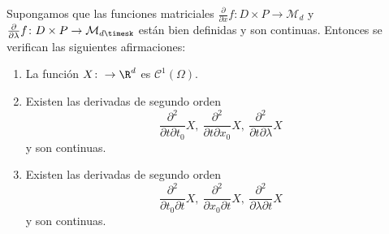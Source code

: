 \begin{theorem}
  \label{thm:-dev-param}
  Supongamos que las funciones matriciales
  $\frac{\partial}{\partial x}f \colon D \times P \to \mathcal{M}_d$ y
  $\frac{\partial}{\partial \lambda} f \colon D \times P \to \mathcal{M}_{d\timesk}$ están bien
  definidas y son continuas. Entonces se verifican las siguientes afirmaciones:
  
  \begin{enumerate}
  \item La función $X \colon \to \R^d$ es $\mathcal{C}^1(\Omega)$.
  \item Existen las derivadas de segundo orden
    \[ \frac{\partial^2}{\partial t \partial t_0}X, \ \frac{\partial^2}{\partial t \partial x_0}X, \
      \frac{\partial^2}{\partial t \partial \lambda}X\] y son continuas.
  \item Existen las derivadas de segundo orden
    \[ \frac{\partial^2}{\partial t_0 \partial t}X, \ \frac{\partial^2}{\partial x_0 \partial t}X, \
      \frac{\partial^2}{\partial \lambda \partial t}X\] y son continuas.
  \end{enumerate}
\end{theorem}

